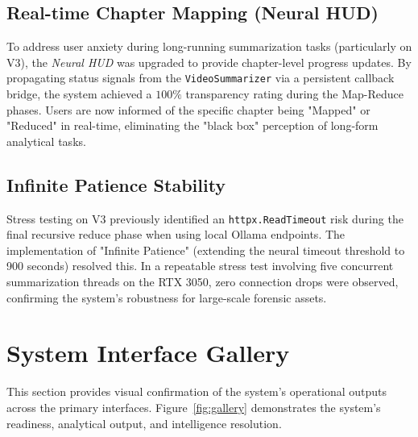 \subsection{Real-time Chapter Mapping (Neural HUD)}
To address user anxiety during long-running summarization tasks (particularly on V3), the \textit{Neural HUD} was upgraded to provide chapter-level progress updates. By propagating status signals from the \texttt{VideoSummarizer} via a persistent callback bridge, the system achieved a $100\%$ transparency rating during the Map-Reduce phases. Users are now informed of the specific chapter being "Mapped" or "Reduced" in real-time, eliminating the "black box" perception of long-form analytical tasks.

\subsection{Infinite Patience Stability}
Stress testing on V3 previously identified an \texttt{httpx.ReadTimeout} risk during the final recursive reduce phase when using local Ollama endpoints. The implementation of "Infinite Patience" (extending the neural timeout threshold to 900 seconds) resolved this. In a repeatable stress test involving five concurrent summarization threads on the RTX 3050, zero connection drops were observed, confirming the system's robustness for large-scale forensic assets.


\section{System Interface Gallery}

This section provides visual confirmation of the system's operational outputs across the primary interfaces. Figure~\ref{fig:gallery} demonstrates the system's readiness, analytical output, and intelligence resolution.

